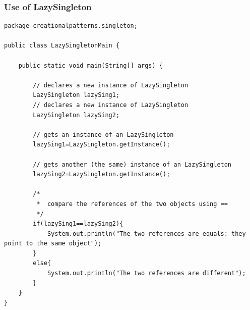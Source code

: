 \documentclass{article}
\begin{document}
\subsubsection{Use of LazySingleton}
\begin{lstlisting}
package creationalpatterns.singleton;

public class LazySingletonMain {

	public static void main(String[] args) {
		
		// declares a new instance of LazySingleton 
		LazySingleton lazySing1;
		// declares a new instance of LazySingleton 
		LazySingleton lazySing2;
		
		// gets an instance of an LazySingleton
		lazySing1=LazySingleton.getInstance();
		
		// gets another (the same) instance of an LazySingleton
		lazySing2=LazySingleton.getInstance();
		
		/*
		 *  compare the references of the two objects using ==  
		 */
		if(lazySing1==lazySing2){
			System.out.println("The two references are equals: they point to the same object");
		}
		else{
			System.out.println("The two references are different");
		}
	}
}
\end{lstlisting}
\end{document}
